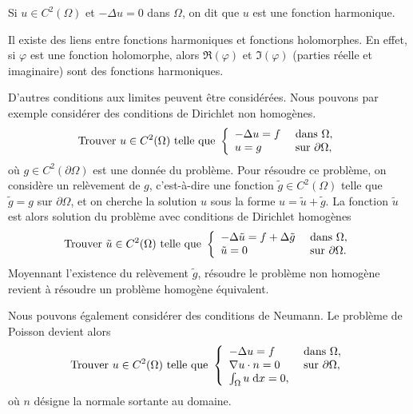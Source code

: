 \documentclass[12pt,a4paper,twoside]{article}
\begin{document}


\begin{definition}
  Si $u \in C^2(\Omega)$ et $- \Delta u = 0$ dans $\Omega$,
  on dit que $u$ est une fonction harmonique.
\end{definition}

Il existe des liens entre fonctions harmoniques et fonctions holomorphes.
En effet, si $\varphi$ est une fonction holomorphe,
alors $\Re(\varphi)$ et $\Im(\varphi)$ (parties r\'eelle et imaginaire)
sont des fonctions harmoniques.


D'autres conditions aux limites peuvent \^etre consid\'er\'ees.
Nous pouvons par exemple consid\'erer des conditions de Dirichlet 
non homog\`enes.
\begin{equation*}
  \text{Trouver $u \in C^2(\Omega)$ telle que  }
  \left\{
    \begin{array}{l l}
      - \Delta u = f &\text{ dans } \Omega ,
      \\
      u = g &\text{ sur } \partial \Omega ,
    \end{array}
  \right.
\end{equation*}
o\`u $g \in C^2(\partial \Omega)$ est une donn\'ee du probl\`eme.
Pour r\'esoudre ce probl\`eme, on consid\`ere un rel\`evement de $g$,
c'est-\`a-dire une fonction $\tilde{g} \in C^2(\Omega)$ telle que
$\tilde{g} = g$ sur $\partial \Omega$,
et on cherche la solution $u$ sous la forme
$u = \tilde{u} + \tilde{g}$.
La fonction $\tilde{u}$ est alors solution du probl\`eme
avec conditions de Dirichlet homog\`enes
\begin{equation*}
  \text{Trouver $\tilde{u} \in C^2(\Omega)$ telle que  }
  \left\{
    \begin{array}{l l}
      - \Delta \tilde{u} = f + \Delta \tilde{g} &\text{ dans } \Omega ,
      \\
      \tilde{u} = 0 &\text{ sur } \partial \Omega .
    \end{array}
  \right.
\end{equation*}
Moyennant l'existence du rel\`evement $\tilde{g}$,
r\'esoudre le probl\`eme non homog\`ene revient \`a 
r\'esoudre un probl\`eme homog\`ene \'equivalent.


Nous pouvons \'egalement consid\'erer des conditions
de Neumann. Le probl\`eme de Poisson devient alors
\begin{align}
  \label{eq:ell_Neu}
  \text{Trouver $u \in C^2(\Omega)$ telle que  }
  \left\{
    \begin{array}{l l}
      - \Delta u = f &\text{ dans } \Omega ,
      \\
      \nabla u \cdot n = 0 &\text{ sur } \partial \Omega ,
      \\
      \int_{\Omega} u \;\mathrm{d} x = 0 ,
    \end{array}
  \right.
\end{align}
o\`u $n$ d\'esigne la normale sortante au domaine.
\end{document}
